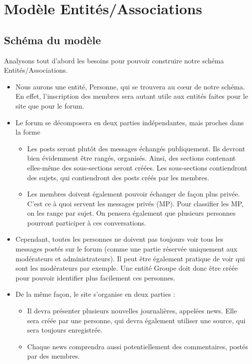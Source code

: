 \section{Modèle Entités/Associations}

\subsection{Schéma du modèle}
Analysons tout d'abord les besoins pour pouvoir construire notre schéma Entités/Associations.
\begin{itemize}
	\item Nous aurons une entité, Personne, qui se trouvera au c\oe ur de notre schéma. En effet, l'inscription des membres sera autant utile aux entités faites pour le site que pour le forum.
	\item Le forum se décomposera en deux parties indépendantes, mais proches dans la forme
		\begin{itemize}
			\item Les posts seront plutôt des messages échangés publiquement. Ils devront bien évidemment être rangés, organisés. Ainsi, des sections contenant elles-même des sous-sections seront créées. Les sous-sections contiendront des sujets, qui contiendront des posts créés par les membres.
			\item Les membres doivent également pouvoir échanger de façon plus privée. C'est ce à quoi servent les messages privés (MP). Pour classifier les MP, on les range par sujet. On pensera également que plusieurs personnes pourront participer à ces conversations.
		\end{itemize}
	\item Cependant, toutes les personnes ne doivent pas toujours voir tous les messages postés sur le forum (comme une partie réservée uniquement aux modérateurs et administrateurs). Il peut être également pratique de voir qui sont les modérateurs par exemple. Une entité Groupe doit donc être créée pour pouvoir identifier plus facilement ces personnes. 
	\item De la même façon, le site s'organise en deux parties :
		\begin{itemize}
			\item Il devra présenter plusieurs nouvelles journalières, appelées news. Elle sera créée par une personne, qui devra également utiliser une source, qui sera toujours enregistrée. 
			\item Chaque news comprendra aussi potentiellement des commentaires, postés par des membres. 
		\end{itemize}
\end{itemize}

